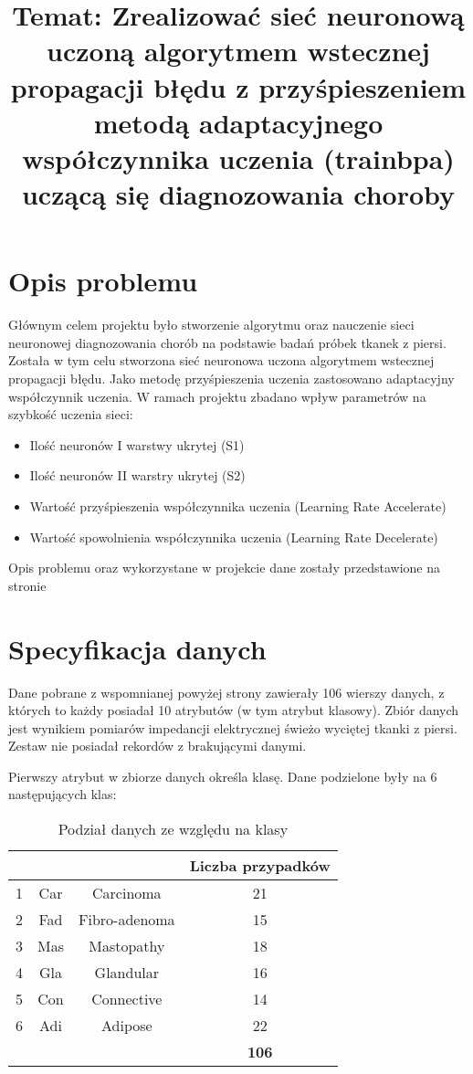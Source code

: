 \documentclass[12pt,twoside]{article}
\title{Temat: Zrealizować sieć neuronową uczoną algorytmem wstecznej propagacji błędu z przyśpieszeniem metodą adaptacyjnego współczynnika uczenia (trainbpa)
uczącą się diagnozowania choroby}
\author{}
\begin{document}
\maketitle

\blankpage

\tableofcontents

\clearpage
\blankpage


\section{Opis problemu}
Głównym celem projektu było stworzenie algorytmu oraz nauczenie sieci neuronowej diagnozowania chorób na podstawie badań próbek tkanek z piersi. Została w tym celu stworzona sieć neuronowa uczona algorytmem wstecznej propagacji błędu. Jako metodę przyśpieszenia uczenia zastosowano adaptacyjny współczynnik uczenia. W ramach projektu zbadano wpływ parametrów na szybkość uczenia sieci:
\begin{itemize}
\item Ilość neuronów I warstwy ukrytej (S1)
\item Ilość neuronów II warstry ukrytej (S2)
\item Wartość przyśpieszenia współczynnika uczenia (Learning Rate Accelerate)
\item Wartość spowolnienia współczynnika uczenia (Learning Rate Decelerate)
\end{itemize}

Opis problemu oraz wykorzystane w projekcie dane zostały przedstawione na stronie \cite{dane}

\clearpage

\section{Specyfikacja danych}
Dane pobrane z wspomnianej powyżej strony zawierały 106 wierszy danych, z których to każdy posiadał 10 atrybutów (w tym atrybut klasowy). Zbiór danych jest wynikiem pomiarów impedancji elektrycznej świeżo wyciętej tkanki z piersi. Zestaw nie posiadał rekordów z brakującymi danymi. 

Pierwszy atrybut w zbiorze danych określa klasę. Dane podzielone były na 6 następujących klas:
\begin{table}[H]
\begin{center}
\begin{tabular}{|c|c|c|c| }
\hline
& & & Liczba przypadków\\
\hline
1&Car & Carcinoma & 21\\
\hline
2&Fad & Fibro-adenoma & 15\\
\hline
3&Mas & Mastopathy & 18\\
\hline
4&Gla & Glandular & 16\\
\hline
5&Con & Connective & 14\\
\hline
6&Adi & Adipose & 22\\
\hline
& & & \textbf{106}\\
\hline
\end{tabular}
\caption{Podział danych ze względu na klasy}
\end{center}
\end{table}
\end{document}
